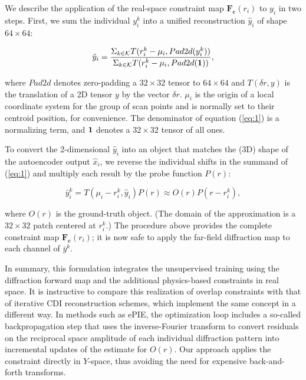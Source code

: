 \documentclass[sn-mathphys]{sn-jnl}%
\theoremstyle{thmstyleone}%
\theoremstyle{thmstyletwo}%
\theoremstyle{thmstylethree}%
\begin{document}
We describe the application of the real-space constraint map $\mathbf{F_c}(r_i)$ to $y_i$ in two steps. First, we sum the individual $y_i^k$ into a unified reconstruction $\hat{y}_i$ of shape $64 \times 64$:


\begin{equation} 
\hat{y}_i = \frac{\Sigma_{k \in \mathcal{K}} T(r_i^k - \mu_i, Pad2d(y_i^k))} {\Sigma_{k \in \mathcal{K}} T(r_i^k - \mu_i, Pad2d(\bf{1}))},\label{eq:1}
\end{equation}

where $Pad2d$ denotes zero-padding a $32 \times 32$ tensor to $64 \times 64$ and $T(\delta r, y)$ is the translation of a 2D tensor $y$ by the vector $\delta r$. $\mu_i$ is the origin of a local coordinate system for the group of scan points and is normally set to their centroid position, for convenience. The denominator of equation (\ref{eq:1}) is a normalizing term, and $\bf{1}$ denotes a $32 \times 32$ tensor of all ones. 

To convert the 2-dimensional $\hat{y}_i$ into an object that matches the (3D) shape of the autoencoder output $\hat{x}_i$, we reverse the individual shifts in the summand of (\ref{eq:1}) and multiply each result by the probe function $P(r)$:

$$
\bar{y}_i^k = T(\mu_i - r_i^k, \hat{y}_i) P(r) \approx O(r) P(r - r_i^k),
$$

where $O(r)$ is the ground-truth object. (The domain of the approximation is a $32 \times 32$ patch centered at $r_i^k$.) The procedure above provides the complete constraint map $\mathbf{F_c}(r_i)$; it is now safe to apply the far-field diffraction map to each channel of $\bar{y}^k$.

In summary, this formulation integrates the unsupervised training using the diffraction forward map and the additional physics-based constraints in real space. It is instructive to compare this realization of overlap constraints with that of iterative CDI reconstruction schemes, which implement the same concept in a different way. In methods such as ePIE, the optimization loop includes a so-called backpropagation step that uses the inverse-Fourier transform to convert residuals on the reciprocal space amplitude of each individual diffraction pattern into incremental updates of the estimate for $O(r)$. \cite{epie} Our approach applies the constraint directly in $Y$-space, thus avoiding the need for expensive back-and-forth transforms. 

\end{document}
